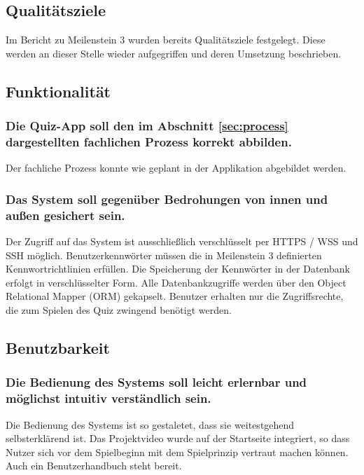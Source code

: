 \documentclass[a4paper,11pt,listof=numbered,glossary=totoc,parskip=half,toc=bib]{scrreprt}
\begin{document}
\begin{appendices}
		
		
		
	
	\chapter{Qualitätsziele}
	\label{chap:qziele}
	
	Im Bericht zu Meilenstein 3 wurden bereits Qualitätsziele festgelegt. Diese werden an dieser Stelle wieder aufgegriffen und deren Umsetzung beschrieben.
	
	\section{Funktionalität}
	
	\subsection{Die Quiz-App soll den im Abschnitt \ref{sec:process} dargestellten fachlichen Prozess korrekt abbilden.}
	Der fachliche Prozess konnte wie geplant in der Applikation abgebildet werden.	
	
	\subsection{Das System soll gegenüber Bedrohungen von innen und außen gesichert sein.} 
	Der Zugriff auf das System ist ausschließlich verschlüsselt per HTTPS / WSS und SSH möglich. Benutzerkennwörter müssen die in Meilenstein 3 definierten Kennwortrichtlinien erfüllen. Die Speicherung der Kennwörter in der Datenbank erfolgt in verschlüsselter Form. Alle Datenbankzugriffe werden über den Object Relational Mapper (ORM) gekapselt. Benutzer erhalten nur die Zugriffsrechte, die zum Spielen des Quiz zwingend benötigt werden.
	
	\section{Benutzbarkeit}
	\subsection{Die Bedienung des Systems soll leicht erlernbar und möglichst intuitiv verständlich sein.}
	Die Bedienung des Systems ist so gestaletet, dass sie weitestgehend selbsterklärend ist. Das Projektvideo wurde auf der Startseite integriert, so dass Nutzer sich vor dem Spielbeginn mit dem Spielprinzip vertraut machen können. Auch ein Benutzerhandbuch steht bereit.

\end{appendices}
\end{document}
